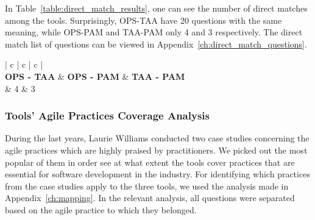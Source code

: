 In Table~\ref{table:direct_match_results}, one can see the number of direct matches among the tools. Surprisingly, \ac{OPS}-\ac{TAA} have 20 questions with the same meaning, while \ac{OPS}-\ac{PAM} and \ac{TAA}-\ac{PAM} only 4 and 3 respectively. The direct match list of questions can be viewed in Appendix~\ref{ch:direct_match_questions}. 

\begin{table} [H]
	\begin{tabular}{{| c | c | c |}}
		\hline
		  \\ \hline
		\textbf{OPS - TAA} & \textbf{OPS - PAM} & \textbf{TAA - PAM} \\  & 4 & 3 \\ \hline
	\end{tabular}
\caption{Direct Match Questions Among Tools - Results}
\label{table:direct_match_results}
\end{table} 


\subsubsection{Tools' Agile Practices Coverage Analysis}
\label{subsubsec:coverage_analysis}
During the last years, Laurie Williams conducted two case studies \cite{Williams_Microsoft, laurie_williams} concerning the agile practices which are highly praised by practitioners. We picked out the most popular of them in order see at what extent the tools cover practices that are essential for software development in the industry. For identifying which practices from the case studies apply to the three tools, we used the analysis made in Appendix~\ref{ch:mapping}. In the relevant analysis, all questions were separated based on the agile practice to which they belonged.

